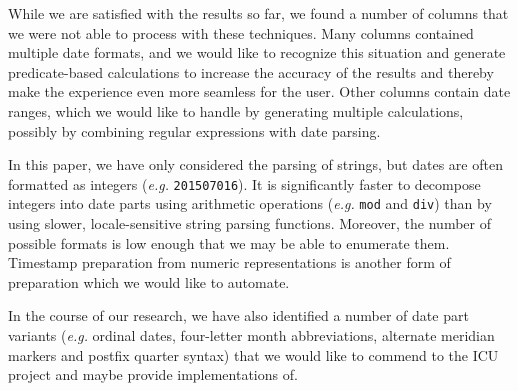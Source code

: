 While we are satisfied with the results so far, we found a number of columns that we were not able to process with these techniques. Many columns contained multiple date formats, and we would like to recognize this situation and generate predicate-based calculations to increase the accuracy of the results and thereby make the experience even more seamless for the user. Other columns contain date ranges, which we would like to handle by generating multiple calculations, possibly by combining regular expressions with date parsing.

In this paper, we have only considered the parsing of strings, but dates are often formatted as integers (\textit{e.g.} \texttt{201507016}). It is significantly faster to decompose integers into date parts using arithmetic operations (\textit{e.g.} \texttt{mod} and \texttt{div}) than by using slower, locale-sensitive string parsing functions. Moreover, the number of possible formats is low enough that we may be able to enumerate them. Timestamp preparation from numeric representations is another form of preparation which we would like to automate.

In the course of our research, we have also identified a number of date part variants (\textit{e.g.} ordinal dates, four-letter month abbreviations, alternate meridian markers and postfix quarter syntax) that we would like to commend to the ICU project and maybe provide implementations of.
